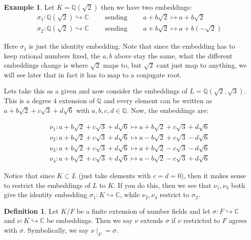 \documentclass[11pt,a4paper]{report}
\theoremstyle{plain}
\theoremstyle{definition}
\newtheorem{definition}[subsection]{Definition}
\newtheorem{exmp}[subsection]{Example}
\theoremstyle{definition}
\def\CC{\mathbb{C}}
\def\QQ{\mathbb{Q}}
\def \s {\sigma}
\def \s {\sigma}
\begin{document}
	\begin{exmp}
		Let $K=\QQ(\sqrt{2})$ then we have two embeddings: 
		\begin{align}
			&\s_1: \QQ(\sqrt{2}) \hookrightarrow \CC \qquad \text{ sending } \qquad a+b\sqrt{2} \mapsto a+b\sqrt{2}\\
			&\s_2: \QQ(\sqrt{2}) \hookrightarrow \CC \qquad \text{ sending } \qquad a+b\sqrt{2} \mapsto a+b(-\sqrt{2})
		\end{align}
		
		Here $\s_1$ is just the identity embedding. Note that since the embedding has to keep rational numbers fixed, the $a,b$ above stay the same, what the different embeddings change is where $\sqrt{2}$ maps to, but $\sqrt{2}$ cant just map to anything, we will see later that in fact it has to map to a conjugate root.
		
		Lets take this as a given and now consider the embeddings of $L=\QQ(\sqrt{2},\sqrt{3})$. This is a degree $4$ extension of $\QQ$ and every element can be written as $a+b\sqrt{2}+c\sqrt{3}+d\sqrt{6}$ with $a,b,c,d \in \QQ$. Now, the embeddings are:
		
		\begin{align}
			&\nu_1: a+b\sqrt{2}+c\sqrt{3}+d\sqrt{6} \longmapsto a+b\sqrt{2}+c\sqrt{3}+d\sqrt{6}\\
			&\nu_2: a+b\sqrt{2}+c\sqrt{3}+d\sqrt{6} \longmapsto a-b\sqrt{2}+c\sqrt{3}-d\sqrt{6}\\
			&\nu_3: a+b\sqrt{2}+c\sqrt{3}+d\sqrt{6} \longmapsto a+b\sqrt{2}-c\sqrt{3}-d\sqrt{6}\\	
			&\nu_4: a+b\sqrt{2}+c\sqrt{3}+d\sqrt{6} \longmapsto a-b\sqrt{2}-c\sqrt{3}+d\sqrt{6}
		\end{align}
		
		Notice that since $K \subset L$ (just take elements with $c=d=0$), then it makes sense to restrict the embeddings of $L$ to $K$. If you do this, then we see that $\nu_1,\nu_3$ both give the identity embedding $\s_1:K \hookrightarrow \CC$, while $\nu_2,\nu_4$ restrict to $\s_2$.
		
	\end{exmp}
	
	\begin{definition}\label{definition: emb ext}
		Let $K/F$ be a finite extension of number fields and let $\s:F \hookrightarrow \CC$  and $\nu: K \hookrightarrow \CC$ be embeddings. Then we say $\nu$ extends $\s$ if $\nu$ restricted to $F$ agrees with $\s$. Symbolically, we say $\nu{\mid_F}=\s$.
	\end{definition}
	
\end{document}
